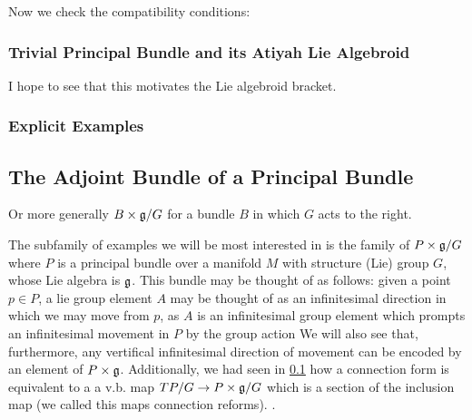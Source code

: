 Now we check the compatibility conditions:

\subsubsection{Trivial Principal Bundle and its Atiyah Lie Algebroid}

I hope to see that this motivates the Lie algebroid bracket.

\subsubsection{Explicit Examples}



\subsection{The Adjoint Bundle of a Principal Bundle}

Or more generally $B \times \mathfrak{g} / G$ for a bundle $B$ in which $G$ acts to the right.

The subfamily of examples we will be most interested in is the family of $P \times \mathfrak{g}/G$ where $P$ is a principal bundle over a manifold $M$ with structure (Lie) group $G$, whose Lie  algebra is $\mathfrak{g}$. This bundle may be thought of as follows: given a point $p \in P$, a lie group element $A$ may be thought of as an infinitesimal direction in which we may move from $p$, as $A$ is an infinitesimal group element which prompts an infinitesimal movement in $P$ by the group action We will also see that, furthermore, any vertifical infinitesimal direction of movement can be encoded by an element of $P \times \mathfrak{g}$. Additionally, we had seen in \ref{} how a connection form is equivalent to a  a v.b. map $TP/G \to P \times \mathfrak{g}/G$ which is a section of the inclusion map (we called this maps connection reforms). .


